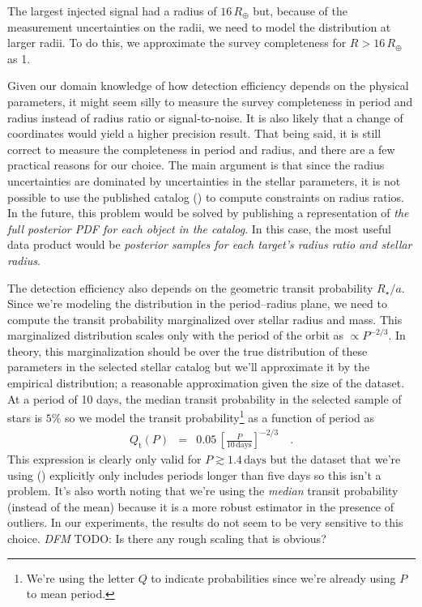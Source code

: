 \documentclass[12pt,preprint]{aastex}
\newcommand{\todo}[3]{{\color{#2} \emph{#1} TODO: #3}}
\newcommand{\dfmtodo}[1]{\todo{DFM}{red}{#1}}
\newcommand{\radius}{\ensuremath{R}}
\newcommand{\period}{\ensuremath{P}}
\newcommand{\transitprob}{{\ensuremath{Q_\mathrm{t}}}}
\begin{document}
The largest injected signal had a radius of $16\,R_\oplus$ but, because of the
measurement uncertainties on the radii, we need to model the distribution at
larger radii.
To do this, we approximate the survey completeness for $\radius>16\,R_\oplus$
as 1.

Given our domain knowledge of how detection efficiency depends on the physical
parameters, it might seem silly to measure the survey completeness in period
and radius instead of radius ratio or signal-to-noise.
It is also likely that a change of coordinates would yield a higher precision
result.
That being said, it is still correct to measure the completeness in period and
radius, and there are a few practical reasons for our choice.
The main argument is that since the radius uncertainties are dominated by
uncertainties in the stellar parameters, it is not possible to use the
published catalog (\citealt{petigura}) to compute constraints on radius
ratios.
In the future, this problem would be solved by publishing a representation of
\emph{the full posterior PDF for each object in the catalog}.
In this case, the most useful data product would be \emph{posterior samples
for each target's radius ratio and stellar radius}.

The detection efficiency also depends on the geometric transit probability
$R_\star/a$.
Since we're modeling the distribution in the period--radius plane, we need to
compute the transit probability marginalized over stellar radius and mass.
This marginalized distribution scales only with the period of the orbit as
$\propto \period^{-2/3}$.
In theory, this marginalization should be over the true distribution of these
parameters in the selected stellar catalog but we'll approximate it by
the empirical distribution; a reasonable approximation given the size of the
dataset.
At a period of 10 days, the median transit probability in the selected sample
of stars is $5\%$ so we model the transit probability\footnote{We're using the
letter $Q$ to indicate probabilities since we're already using $P$ to mean
period.} as a function of period as
\begin{eqnarray}
\transitprob (\period) &=&
    0.05\,\left[\frac{\period}{10\,\mathrm{days}}\right]^{-2/3} \quad.
\end{eqnarray}
This expression is clearly only valid for $\period \gtrsim 1.4\,\mathrm{days}$
but the dataset that we're using (\citealt{petigura}) explicitly only includes
periods longer than five days so this isn't a problem.
It's also worth noting that we're using the \emph{median} transit probability
(instead of the mean) because it is a more robust estimator in the presence of
outliers.
In our experiments, the results do not seem to be very sensitive to this
choice.
\dfmtodo{Is there any rough scaling that is obvious?}
\end{document}
